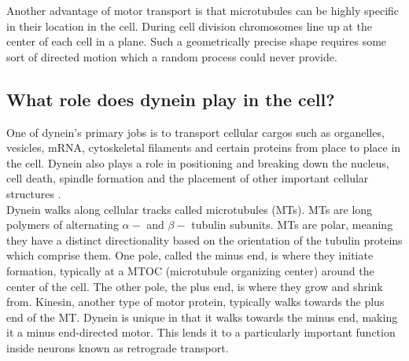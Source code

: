 \documentclass[
11pt, %
english, %
singlespacing, %
headsepline, %
chapterinoneline, %
]{MastersDoctoralThesis} %
\begin{document}

Another advantage of motor transport is that microtubules can be highly specific in their location in the cell. During cell division chromosomes line up at the center of each cell in a plane. Such a geometrically precise shape requires some sort of directed motion which a random process could never provide.\\

\subsection{What role does dynein play in the cell?}
One of dynein's primary jobs is to transport cellular cargos such as organelles, vesicles, mRNA, cytoskeletal filaments and certain proteins from place to place in the cell. Dynein also plays a role in positioning and breaking down the nucleus, cell death, spindle formation and the placement of other important cellular structures \cite{valetoolbox}.\\

Dynein walks along cellular tracks called microtubules (MTs). MTs are long polymers of alternating $\alpha-$ and $\beta-$ tubulin subunits. MTs are polar, meaning they have a distinct directionality based on the orientation of the tubulin proteins which comprise them. One pole, called the minus end, is where they initiate formation, typically at a MTOC (microtubule organizing center) around the center of the cell. The other pole, the plus end, is where they grow and shrink from. Kinesin, another type of motor protein, typically walks towards the plus end of the MT. Dynein is unique in that it walks towards the minus end, making it a minus end-directed motor. This lends it to a particularly important function inside neurons known as retrograde transport.\\
\end{document}
